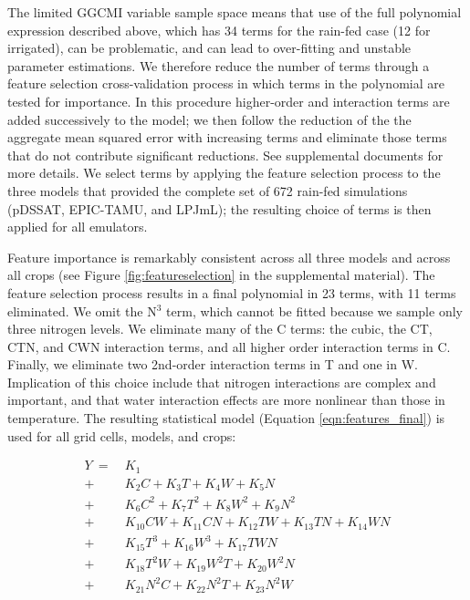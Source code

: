 \documentclass[preprint, 5p, times, twocolumn]{elsarticle}
\begin{document}
The limited GGCMI variable sample space means that use of the full polynomial expression described above, which has 34 terms for the rain-fed case (12 for irrigated), can be problematic, and can lead to over-fitting and unstable parameter estimations. We therefore reduce the number of terms through a feature selection cross-validation process in which terms in the polynomial are tested for importance. In this procedure higher-order and interaction terms are added successively to the model; we then follow the reduction of the the aggregate mean squared error with increasing terms and eliminate those terms that do not contribute significant reductions. See supplemental documents for more details. We select terms by applying the feature selection process to the three models that provided the complete set of 672 rain-fed simulations (pDSSAT, EPIC-TAMU, and LPJmL); the resulting choice of terms is then applied for all emulators. 

Feature importance is remarkably consistent across all three models and across all crops (see Figure \ref{fig:featureselection} in the supplemental material). The feature selection process results in a final polynomial in 23 terms, with 11 terms eliminated. We omit the N$^3$ term, which cannot be fitted because we sample only three nitrogen levels. We eliminate many of the C terms: the cubic, the CT, CTN, and CWN interaction terms, and all higher order interaction terms in C.  Finally, we eliminate two 2nd-order interaction terms in T and one in W. Implication of this choice include that nitrogen interactions are complex and important, and that water interaction effects are more nonlinear than those in temperature. The resulting statistical model (Equation \ref{eqn:features_final}) is used for all grid cells, models, and crops: 

\begin{align}
    \label{eqn:features_final}
    Y\ = \ & K_{1}  \\
       + \ & K_{2}  C     + K_{3}  T     + K_{4}  W     + K_{5}  N   \nonumber \\
       + \ & K_{6}  C^2   + K_{7}  T^2   + K_{8}  W^2   + K_{9}  N^2 \nonumber \\
       + \ & K_{10} C W   + K_{11} C N   + K_{12} T W   + K_{13} T N + K_{14} W N \nonumber \\ %
       + \ & K_{15} T^3   + K_{16} W^3   + K_{17} T W N  \nonumber \\ %
       + \ & K_{18} T^2 W + K_{19} W^2 T + K_{20} W^2 N  \nonumber \\ %
       + \ & K_{21} N^2 C + K_{22} N^2 T + K_{23} N^2 W  \nonumber    %
\end{align}
\end{document}
